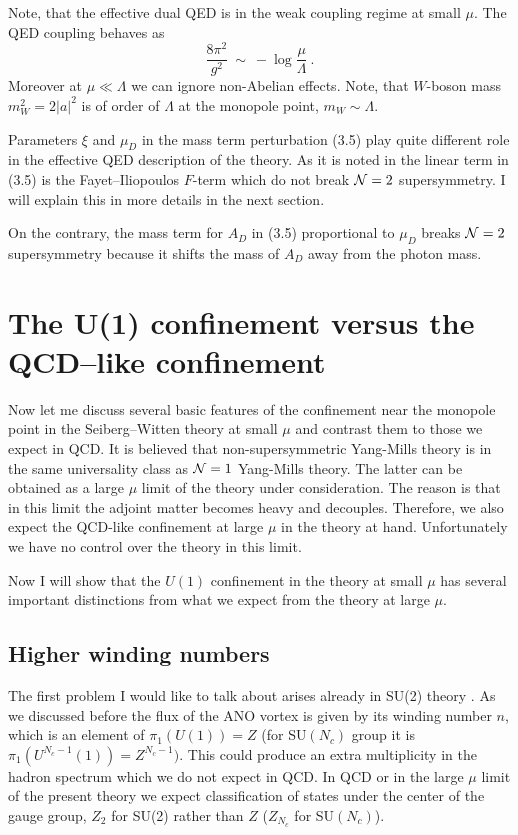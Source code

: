 \documentclass[a4paper,12pt]{article}
\begin{document}
Note, that the effective  dual QED is in the weak coupling regime at small
$\mu $. The QED coupling behaves as
\begin{equation}
\frac{8\pi^2}{g^2}\ \sim\ -\log\frac{\mu }\Lambda\ .
\end{equation}
Moreover at $\mu\ll\Lambda$ we can ignore non-Abelian effects. Note,
that $W$-boson mass $m^2_W=2|a|^2$ is of order of $\Lambda$ at
the monopole point, $m_W\sim\Lambda$.


Parameters $\xi$ and $\mu_{D}$ in the mass term perturbation
(3.5) play quite
different role in the effective QED description of the theory.
As it is noted in \cite{HSZ} the linear term in (3.5)
is the Fayet--Iliopoulos $F$-term which do not break ${\cal N}=2$
supersymmetry.  I will explain this in more details in the next
section.

On the contrary, the mass term for $A_D$ in (3.5) proportional to $\mu_{D}$
breaks ${\cal N}=2$ supersymmetry because it shifts the mass of $A_D$
away from the photon mass.


\section{The U(1) confinement versus the QCD--like
confinement}
\setcounter{equation}{0}

Now let me discuss several basic features of the confinement near
the monopole point in the Seiberg--Witten theory 
at small $\mu$ and contrast
them to those we expect in QCD. It is believed that non-supersymmetric
Yang-Mills theory  is in the same universality class as ${\cal N}=1$
Yang-Mills theory. The latter can be obtained as 
a large $\mu $ limit of the theory under consideration.
The reason is that in this limit the adjoint matter
 becomes heavy and decouples.
 Therefore, we  also expect the QCD-like
confinement at large $\mu$ in the theory at hand.
Unfortunately we have no control over the theory in this limit.

 Now I will
show that the $U(1)$ confinement in the theory at small $\mu$
has several important distinctions from what we expect from the theory
at large $\mu$. 

\subsection{Higher winding numbers}

The first problem I would like to talk about arises already in
SU(2) theory \cite{S}. As we discussed before the
flux of the ANO vortex is given by its winding number $n$, which
is an element of $\pi_1(U(1))=Z$ (for SU$(N_c)$ group it is
$\pi_1(U^{N_c-1}(1))=Z^{N_c-1})$. This could produce an extra
multiplicity in the hadron spectrum which we do not expect in
QCD. In QCD or in the large $\mu$ limit of the present theory we
expect classification of states under the center of the gauge
group, $Z_2$ for SU(2) rather than $Z$ ($Z_{N_c}$ for
SU$(N_c)$).
\end{document}
